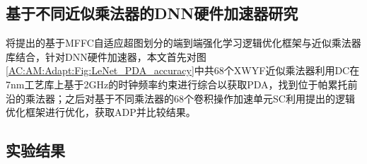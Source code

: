 \subsection{基于不同近似乘法器的DNN硬件加速器研究}

将提出的基于MFFC自适应超图划分的端到端强化学习逻辑优化框架与近似乘法器库结合，针对DNN硬件加速器，本文首先对图\ref{AC:AM:Adapt:Fig:LeNet_PDA_accuracy}中共68个XWYF近似乘法器利用DC在7nm工艺库\cite{ASAP7_github}上基于2GHz的时钟频率约束进行综合以获取PDA，找到位于帕累托前沿的乘法器；之后对基于不同乘法器的68个卷积操作加速单元SC\cite{Accelerator:SC}利用提出的逻辑优化框架进行优化，获取ADP并比较结果。


\subsection{实验结果}


